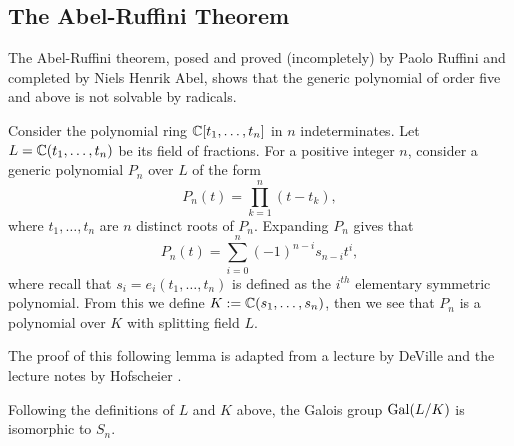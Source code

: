 \subsection{The Abel-Ruffini Theorem}
The Abel-Ruffini theorem, posed and proved (incompletely) by Paolo Ruffini and completed by Niels Henrik Abel, shows that the generic polynomial of order five and above is not solvable by radicals. 

Consider the polynomial ring $\mathbb C[t_1, \dots, t_n]$ in $n$ indeterminates. Let $L = \mathbb C(t_1, \dots, t_n)$ be its field of fractions. For a positive integer $n$, consider a generic polynomial $P_n$ over $L$ of the form
$$
P_n(t) = \prod_{k=1}^{n} (t - t_k),
$$
where $t_1, \dots, t_n $ are $n$ distinct roots of $P_n$. Expanding $P_n$ gives that 
$$
P_n(t) = \sum_{i=0}^{n} (-1)^{n - i} s_{n-i} t^i,
$$
where recall that $s_{i} = e_i(t_1,\dots,t_n)$ is defined as the $i^{th}$ elementary symmetric polynomial. From this we define $K := \mathbb C(s_1, \dots, s_n)$, then we see that $P_n$ is a polynomial over $K$ with splitting field $L$. 

%
%

The proof of this following lemma is adapted from a lecture by DeVille \cite{galois-lecture-polynomials} and the lecture notes by Hofscheier \cite{commutative-algebra-uon}. 

\begin{lemma}\label{lemma:galois-symmetric}
	Following the definitions of $L$ and $K$ above, the Galois group $\operatorname{Gal}(L/K)$ is isomorphic to $S_n$.
\end{lemma}

